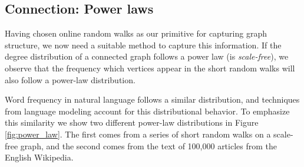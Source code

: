 \documentclass{sig-alternate}
\begin{document}


\subsection{Connection: Power laws}
Having chosen online random walks as our primitive for capturing graph structure, we now need a suitable method to capture this information.  
If the degree distribution of a connected graph follows a power law (is \emph{scale-free}), we observe that the frequency which vertices appear in the short random walks will also follow a power-law distribution.  

Word frequency in natural language follows a similar distribution, and techniques from language modeling account for this distributional behavior.
To emphasize this similarity we show two different power-law distributions in Figure \ref{fig:power_law}. 
The first comes from a series of short random walks on a scale-free graph, and the second comes from the text of 100,000 articles from the English Wikipedia.
\end{document}
